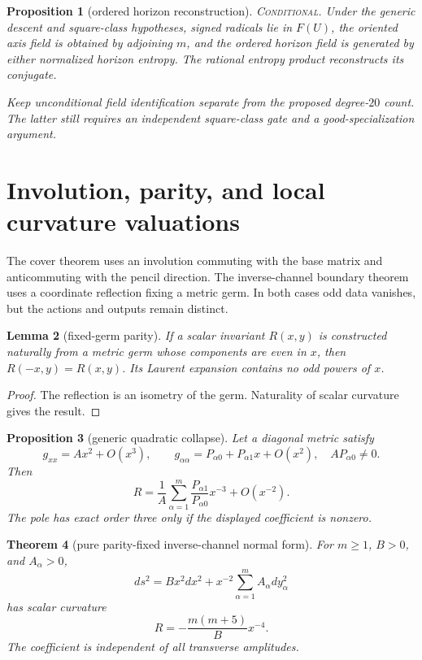 \documentclass[11pt]{article}
\newtheorem{theorem}{Theorem}[section]
\newtheorem{proposition}[theorem]{Proposition}
\newtheorem{lemma}[theorem]{Lemma}
\theoremstyle{remark}
\newcommand{\status}[1]{\textup{\textsc{#1}}}
\newcommand{\conditional}{\status{Conditional}}
\newcommand{\proofstop}[1]{\par\medskip\noindent{\color{red!75!black}\textbf{STOP--PROOF.}} \textit{#1}\par\medskip}
\begin{document}
\begin{proposition}[ordered horizon reconstruction]
\conditional.
Under the generic descent and square-class hypotheses, signed radicals lie
in $F(U)$, the oriented axis field is obtained by adjoining $m$, and the
ordered horizon field is generated by either normalized horizon entropy.
The rational entropy product reconstructs its conjugate.
\end{proposition}

\proofstop{Keep unconditional field identification separate from the
proposed degree-$20$ count. The latter still requires an independent
square-class gate and a good-specialization argument.}

\section{Involution, parity, and local curvature valuations}

The cover theorem uses an involution commuting with the base matrix and
anticommuting with the pencil direction. The inverse-channel boundary theorem uses a
coordinate reflection fixing a metric germ. In both cases odd data vanishes,
but the actions and outputs remain distinct.

\begin{lemma}[fixed-germ parity]
If a scalar invariant $R(x,y)$ is constructed naturally from a metric germ
whose components are even in $x$, then $R(-x,y)=R(x,y)$. Its Laurent
expansion contains no odd powers of $x$.
\end{lemma}

\begin{proof}
The reflection is an isometry of the germ. Naturality of scalar curvature
gives the result.
\end{proof}

\begin{proposition}[generic quadratic collapse]\label{prop:generic}
Let a diagonal metric satisfy
\[
g_{xx}=Ax^2+O(x^3),\qquad
g_{\alpha\alpha}
=P_{\alpha0}+P_{\alpha1}x+O(x^2),
\quad AP_{\alpha0}\neq0.
\]
Then
\[
R=
\frac1A\sum_{\alpha=1}^{m}
\frac{P_{\alpha1}}{P_{\alpha0}}x^{-3}
+O(x^{-2}).
\]
The pole has exact order three only if the displayed coefficient is nonzero.
\end{proposition}

\begin{theorem}[pure parity-fixed inverse-channel normal form]
\label{thm:paritynormal}
For $m\geq1$, $B>0$, and $A_\alpha>0$,
\[
ds^2=Bx^2dx^2+x^{-2}\sum_{\alpha=1}^{m}
A_\alpha dy_\alpha^2
\]
has scalar curvature
\[
R=-\frac{m(m+5)}B x^{-4}.
\]
The coefficient is independent of all transverse amplitudes.
\end{theorem}
\end{document}
